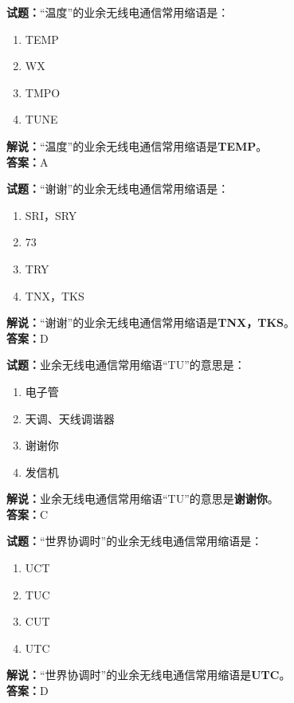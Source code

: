 \documentclass{ctexbook}
\begin{document}
\bigskip


\noindent\textbf{试题：}“温度”的业余无线电通信常用缩语是：
\begin{enumerate}[leftmargin=3em]
\item TEMP
\item WX
\item TMPO
\item TUNE
\end{enumerate}
\noindent\textbf{解说：}“温度”的业余无线电通信常用缩语是\textbf{TEMP}。\\\noindent\textbf{答案：}A


\bigskip


\noindent\textbf{试题：}“谢谢”的业余无线电通信常用缩语是：
\begin{enumerate}[leftmargin=3em]
\item SRI，SRY
\item 73
\item TRY
\item TNX，TKS
\end{enumerate}
\noindent\textbf{解说：}“谢谢”的业余无线电通信常用缩语是\textbf{TNX，TKS}。\\\noindent\textbf{答案：}D



\bigskip


\noindent\textbf{试题：}业余无线电通信常用缩语“TU”的意思是：
\begin{enumerate}[leftmargin=3em]
\item 电子管
\item 天调、天线调谐器
\item 谢谢你
\item 发信机
\end{enumerate}
\noindent\textbf{解说：}业余无线电通信常用缩语“TU”的意思是\textbf{谢谢你}。\\\noindent\textbf{答案：}C



\bigskip


\noindent\textbf{试题：}“世界协调时”的业余无线电通信常用缩语是：
\begin{enumerate}[leftmargin=3em]
\item UCT
\item TUC
\item CUT
\item UTC
\end{enumerate}
\noindent\textbf{解说：}“世界协调时”的业余无线电通信常用缩语是\textbf{UTC}。\\\noindent\textbf{答案：}D
\end{document}
